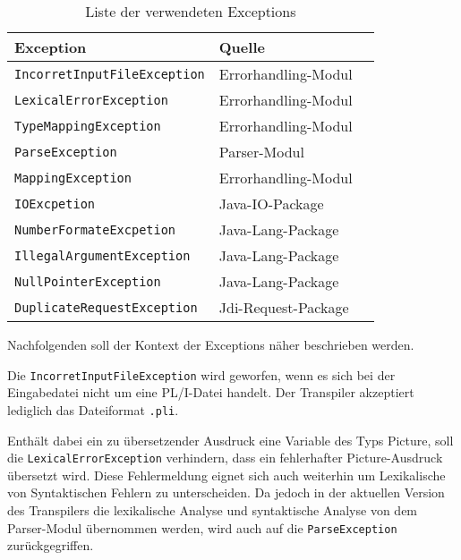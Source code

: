 \begin{table}[h]
	\centering
	
	\label{tab:exceptiontabelle}
\begin{tabular}[h]{|l|l|l|}
	\hline
	\textbf{Exception} & \textbf{Quelle}  \\
	\hline
	\verb+IncorretInputFileException+ & Errorhandling-Modul  \\

	\verb+LexicalErrorException+ & Errorhandling-Modul  \\

	\verb+TypeMappingException+ & Errorhandling-Modul \\

	\verb+ParseException+ & Parser-Modul \\

	\verb+MappingException+ & Errorhandling-Modul \\

	\verb+IOExcpetion+ & Java-IO-Package \\

	\verb+NumberFormateExcpetion+ & Java-Lang-Package \\

	\verb+IllegalArgumentException+ & Java-Lang-Package \\
	
	\verb+NullPointerException+ & Java-Lang-Package \\
	
	\verb+DuplicateRequestException+ & Jdi-Request-Package \\
	\hline
	
\end{tabular}
\caption{Liste der verwendeten Exceptions}
\end{table}

Nachfolgenden soll der Kontext der Exceptions näher beschrieben werden.

Die \verb+IncorretInputFileException+ wird geworfen, wenn
es sich bei der Eingabedatei nicht um eine PL/I-Datei handelt.
Der Transpiler akzeptiert lediglich das Dateiformat \verb+.pli+.

Enthält dabei ein zu übersetzender Ausdruck eine Variable des Typs Picture,
soll die \verb+LexicalErrorException+ verhindern, dass ein fehlerhafter Picture-Ausdruck übersetzt wird.
Diese Fehlermeldung eignet sich auch weiterhin um Lexikalische von Syntaktischen Fehlern zu unterscheiden. Da jedoch in der aktuellen Version des Transpilers die lexikalische Analyse und syntaktische Analyse von dem Parser-Modul übernommen werden, wird auch auf die \verb+ParseException+ zurückgegriffen.

